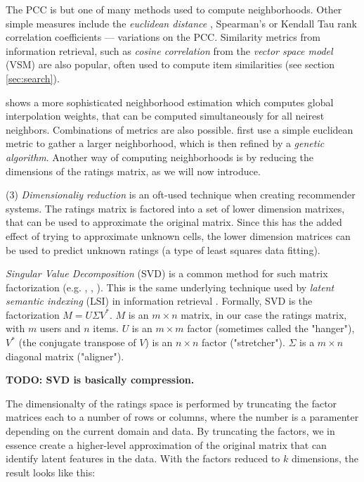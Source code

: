 The PCC is but one of many methods used to compute neighborhoods. 
Other simple measures include the \emph{euclidean distance} \cite[p10]{Segaran2007},
Spearman's or Kendall Tau rank correlation coefficients \cite[p30]{Herlocker2004} --- 
variations on the PCC.
Similarity metrics from information retrieval,
such as \emph{cosine correlation} from the \emph{vector space model} (VSM) are also popular,
often used to compute item similarities (see section \ref{sec:search}).

\cite{Bell2007a} shows a more sophisticated neighborhood estimation which computes global interpolation weights,
that can be computed simultaneously for all neirest neighbors.
Combinations of metrics are also possible. 
\cite{Ujjin} first use a simple euclidean metric to gather a larger neighborhood, which is then refined
by a \emph{genetic algorithm}.
Another way of computing neighborhoods is by reducing the dimensions of the ratings matrix,
as we will now introduce.


(3) \emph{Dimensionaliy reduction} is an oft-used technique when creating recommender systems.
The ratings matrix is factored into a set of lower dimension matrixes, that can be used to approximate the original matrix.
Since this has the added effect of trying to approximate unknown cells, the lower dimension matrices
can be used to predict unknown ratings (a type of least squares data fitting).

\emph{Singular Value Decomposition} (SVD) is a common method for such matrix factorization (e.g. \citet[p5]{Billsus}, \citet{Sun2005}, \citet{Bell2007}).  
This is the same underlying technique used by \emph{latent semantic indexing} (LSI) in information retrieval \cite[p44]{Baeza-Yates1999}.
Formally, SVD is the factorization $M = U \Sigma V^{*}$. 
$M$ is an $m \times n$ matrix, in our case the ratings matrix, with $m$ users and $n$ items. 
$U$ is an $m \times m$ factor (sometimes called the "hanger"), $V^{*}$ (the conjugate transpose of $V$) is an $n \times n$ factor ("stretcher").
$\Sigma$ is a $m \times n$ diagonal matrix ("aligner"). 

\textbf{TODO: SVD is basically compression.}

The dimensionalty of the ratings space is performed by truncating the factor matrices each to a number of rows or columns, 
where the number is a paramenter depending on the current domain and data. By truncating the factors, 
we in essence create a higher-level approximation of the original matrix that can identify latent features in the data.
With the factors reduced to $k$ dimensions, the result looks like this:

